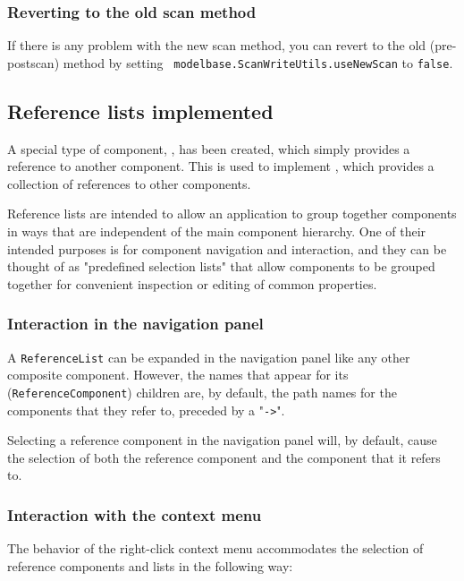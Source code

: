 \documentclass{article}
\begin{document}
\subsubsection*{Reverting to the old scan method}

If there is any problem with the new scan method, you can revert to
the old (pre-postscan) method by setting {\tt
modelbase.ScanWriteUtils.useNewScan} to {\tt false}.

\subsection*{Reference lists implemented}

A special type of component, , has been
created, which simply provides a reference to another component.  This
is used to implement , which provides a
collection of references to other components.

Reference lists are intended to allow an application to group together
components in ways that are independent of the main component
hierarchy.  One of their intended purposes is for component navigation
and interaction, and they can be thought of as "predefined selection
lists" that allow components to be grouped together for convenient
inspection or editing of common properties.

\subsubsection*{Interaction in the navigation panel}

A {\tt ReferenceList} can be expanded in the navigation panel like any
other composite component. However, the names that appear for its
({\tt ReferenceComponent}) children are, by default, the path names
for the components that they refer to, preceded by a "{\tt ->}".

Selecting a reference component in the navigation panel will, by
default, cause the selection of both the reference component and the
component that it refers to.

\subsubsection*{Interaction with the context menu}

The behavior of the right-click context menu accommodates the
selection of reference components and lists in the following way:
\end{document}
